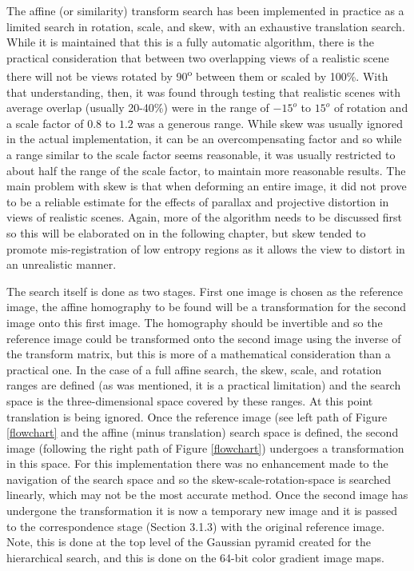 The affine (or similarity) transform search has been implemented in practice as a limited search in rotation, scale, and skew, with an exhaustive translation search. While it is maintained that this is a fully automatic algorithm, there is the practical consideration that between two overlapping views of a realistic scene there will not be views rotated by 90\textsuperscript{o} between them or scaled by 100\%. With that understanding, then, it was found through testing that realistic scenes with average overlap (usually 20-40\%) were in the range of $-15^{o}$ to $15^{o}$ of rotation and a scale factor of $0.8$ to $1.2$ was a generous range. While skew was usually ignored in the actual implementation, it can be an overcompensating factor and so while a range similar to the scale factor seems reasonable, it was usually restricted to about half the range of the scale factor, to maintain more reasonable results. The main problem with skew is that when deforming an entire image, it did not prove to be a reliable estimate for the effects of parallax and projective distortion in views of realistic scenes. Again, more of the algorithm needs to be discussed first so this will be elaborated on in the following chapter, but skew tended to promote mis-registration of low entropy regions as it allows the view to distort in an unrealistic manner.

The search itself is done as two stages. First one image is chosen as the reference image, the affine homography to be found will be a transformation for the second image onto this first image. The homography should be invertible and so the reference image could be transformed onto the second image using the inverse of the transform matrix, but this is more of a mathematical consideration than a practical one. In the case of a full affine search, the skew, scale, and rotation ranges are defined (as was mentioned, it is a practical limitation) and the search space is the three-dimensional space covered by these ranges. At this point translation is being ignored. Once the reference image (see left path of Figure \ref{flowchart} and the affine (minus translation) search space is defined, the second image (following the right path of Figure \ref{flowchart}) undergoes a transformation in this space. For this implementation there was no enhancement made to the navigation of the search space and so the skew-scale-rotation-space is searched linearly, which may not be the most accurate method. Once the second image has undergone the transformation it is now a temporary new image and it is passed to the correspondence stage (Section 3.1.3) with the original reference image. Note, this is done at the top level of the Gaussian pyramid created for the hierarchical search, and this is done on the 64-bit color gradient image maps.

